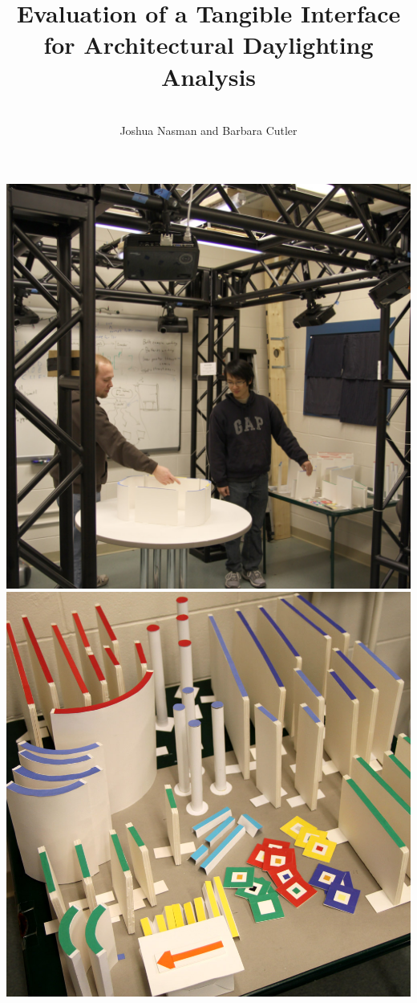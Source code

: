 \documentclass[landscape,20pt]{sciposter}
\title{ Evaluation of a Tangible Interface \\for Architectural Daylighting Analysis}
\author{\ \\ Joshua Nasman and Barbara Cutler}
\institute{Department of Computer Science\\
           Rensselaer Polytechnic Institute\\}
\begin{document}




\maketitle

\vspace{-6.6in}
\begin{minipage}[b]{12.15in}
\includegraphics[width=4.in]{../gi2012_userstudy/images/photos/josh_jonathan_new_contraption}
\includegraphics[width=4.in]{../gi2012_userstudy/images/photos/available_wall_pieces}

\end{minipage}
\end{document}
